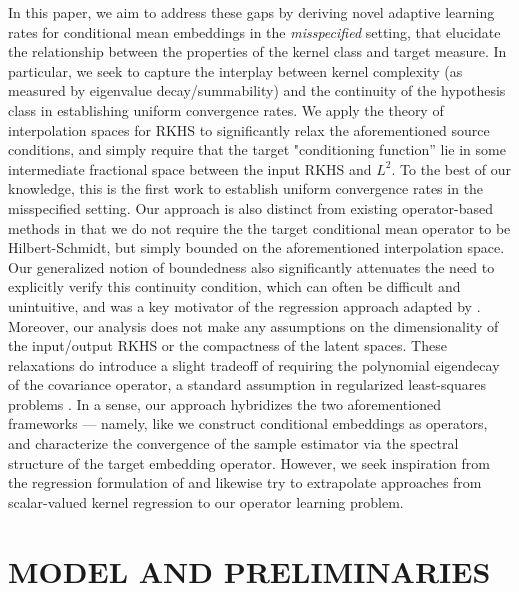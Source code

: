\documentclass[accepted]{article}
\theoremstyle{definition}
\begin{document}
In this paper, we aim to address these gaps by deriving novel adaptive learning rates for conditional mean embeddings in the \textit{misspecified} setting, that elucidate the relationship between the properties of the kernel class and target measure. In particular, we seek to capture the interplay between kernel complexity (as measured by eigenvalue decay/summability) and the continuity of the hypothesis class in establishing uniform convergence rates. We apply the theory of interpolation spaces for RKHS \citep{fischer2020sobolev, steinwart2012mercer} to significantly relax the aforementioned source conditions, and simply require that the target "conditioning function'' lie in some intermediate fractional space between the input RKHS and $L^2$. To the best of our knowledge, this is the first work to establish uniform convergence rates in the misspecified setting. Our approach is also distinct from existing operator-based methods in that we do not require the the target conditional mean operator to be Hilbert-Schmidt, but simply bounded on the aforementioned interpolation space. Our generalized notion of boundedness also significantly attenuates the need to explicitly verify this continuity condition, which can often be difficult and unintuitive, and was a key motivator of the regression approach adapted by \cite{grunewalder2012conditional, park2020measure}. Moreover, our analysis does not make any assumptions on the dimensionality of the input/output RKHS or the compactness of the latent spaces. These relaxations do introduce a slight tradeoff of requiring the polynomial eigendecay of the covariance operator, a standard assumption in regularized least-squares problems \citep{lin12020optimal, lin2020optimal, caponnetto2007optimal}. In a sense, our approach hybridizes the two aforementioned frameworks --- namely, like \cite{song2010nonparametric} we construct conditional embeddings as operators, and characterize the convergence of the sample estimator via the spectral structure of the target embedding operator. However, we seek inspiration from the regression formulation of \cite{grunewalder2012conditional} and likewise try to extrapolate approaches from scalar-valued kernel regression to our operator learning problem.

\section{MODEL AND PRELIMINARIES} \label{Model and Preliminaries}
\end{document}
